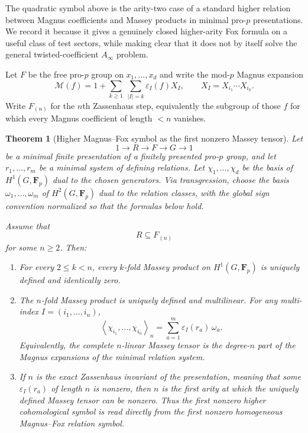 \documentclass[11pt]{article}
\newtheorem{theorem}{Theorem}[section]
\theoremstyle{definition}
\begin{document}
The quadratic symbol above is the arity-two case of a standard higher relation
between Magnus coefficients and Massey products in minimal pro-$p$
presentations.  We record it because it gives a genuinely closed higher-arity
Fox formula on a useful class of test sectors, while making clear that it does
not by itself solve the general twisted-coefficient $A_\infty$ problem.

Let $F$ be the free pro-$p$ group on $x_1,\ldots,x_d$ and write the mod-$p$
Magnus expansion
\[
 \mathcal M(f)
 =1+\sum_{k\ge1}\ \sum_{|I|=k}
 \varepsilon_I(f)X_I,
 \qquad
 X_I=X_{i_1}\cdots X_{i_k}.
\]
Write $F_{(n)}$ for the $n$th Zassenhaus step, equivalently the subgroup of
those $f$ for which every Magnus coefficient of length $<n$ vanishes.

\begin{theorem}[Higher Magnus--Fox symbol as the first nonzero Massey tensor]\label{thm:higher-magnus-massey}
Let
\[
 1\longrightarrow R\longrightarrow F\longrightarrow G\longrightarrow1
\]
be a minimal finite presentation of a finitely presented pro-$p$ group, and let
$r_1,\ldots,r_m$ be a minimal system of defining relations.  Let
$\chi_1,\ldots,\chi_d$ be the basis of $H^1(G,\mathbf F_p)$ dual to the
chosen generators.  Via transgression, choose the basis
$\omega_1,\ldots,\omega_m$ of $H^2(G,\mathbf F_p)$ dual to the relation
classes, with the global sign convention normalized so that the formulas below
hold.

Assume that
\[
 R\subseteq F_{(n)}
\]
for some $n\ge2$.  Then:
\begin{enumerate}[label=\textnormal{(\roman*)}]
\item For every $2\le k<n$, every $k$-fold Massey product on
$H^1(G,\mathbf F_p)$ is uniquely defined and identically zero.

\item The $n$-fold Massey product is uniquely defined and multilinear.  For
any multi-index $I=(i_1,\ldots,i_n)$,
\begin{equation}\label{eq:higher-magnus-massey}
 \left\langle
  \chi_{i_1},\ldots,\chi_{i_n}
 \right\rangle_n
 =
 \sum_{a=1}^{m}
 \varepsilon_I(r_a)\,\omega_a.
\end{equation}
Equivalently, the complete $n$-linear Massey tensor is the degree-$n$ part of
the Magnus expansions of the minimal relation system.

\item If $n$ is the exact Zassenhaus invariant of the presentation, meaning
that some $\varepsilon_I(r_a)$ of length $n$ is nonzero, then $n$ is the first
arity at which the uniquely defined Massey tensor can be nonzero.  Thus the
first nonzero higher cohomological symbol is read directly from the first
nonzero homogeneous Magnus--Fox relation symbol.
\end{enumerate}
\end{theorem}
\end{document}
